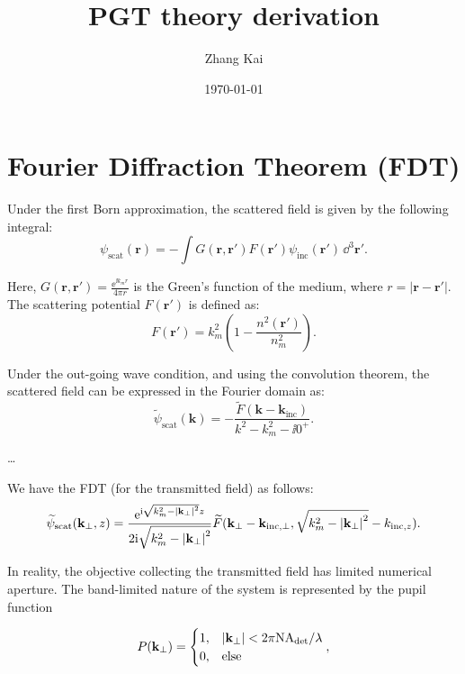 \documentclass{mynotes}
\begin{document}
\title{PGT theory derivation}
\author{Zhang Kai}
\date{\today}

\tableofcontents

\maketitle

\section{Fourier Diffraction Theorem (FDT)}
Under the first Born approximation, the scattered field is given by the following integral:
\begin{equation}
	\psi_{\text{scat}}(\mathbf{r}) = -\int G(\mathbf{r},\mathbf{r}') F(\mathbf{r}') \psi_{\text{inc}}(\mathbf{r}') \, \dd^3\mathbf{r}'.
\end{equation}

Here, \(G(\mathbf{r},\mathbf{r}')=\frac{\ee^{\ii k_m r}}{4\pi r}\) is the Green's function of the medium, where \(r = |\mathbf{r} - \mathbf{r}'|\).
The scattering potential \(F(\mathbf{r}')\) is defined as:
\begin{equation}
	F(\mathbf{r}') = k_m^2 \left( 1 - \frac{n^2(\mathbf{r}')}{n_m^2} \right).
\end{equation}

Under the out-going wave condition, and using the convolution theorem, the scattered field can be expressed in the Fourier domain as:
\begin{equation}
	\widetilde{\psi}_{\text{scat}}(\mathbf{k}) = -\frac{\widetilde{F}(\mathbf{k}-\mathbf{k}_{\text{inc}})}{k^2 - k_m^2 - \ii 0^+}.
\end{equation}

\dots

We have the FDT (for the transmitted field) as follows:
\begin{equation}\label{eq:fdt}
	\widetilde{\psi}_{\text{scat}}(\mathbf{k}_{\perp},z)
	=\frac{\mathrm{e}^{\mathrm{i} \sqrt{k_m^2 - \abs{\mathbf{k}_{\perp}}^2} z}}
	{2\mathrm{i} \sqrt{k_m^2 - \abs{\mathbf{k}_{\perp}}^2}}
	\widetilde{F}(\mathbf{k}_{\perp} - \mathbf{k}_{\text{inc}, \perp}, \sqrt{k_m^2 - \abs{\mathbf{k}_{\perp}}^2} - k_{\text{inc}, z}).
\end{equation}

In reality, the objective collecting the transmitted field has limited numerical aperture. The band-limited nature of the system is represented by the
pupil function

\begin{equation}
	P(\mathbf{k}_{\perp})
	=\begin{cases}
		1, & \abs{\mathbf{k}_{\perp}}<2\pi\text{NA}_{\text{det}}/\lambda \\
		0, & \text{else}
	\end{cases},
\end{equation}
\end{document}
